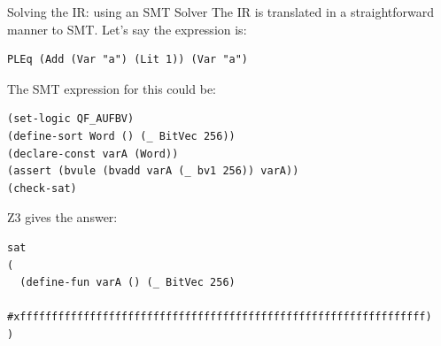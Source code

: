 \documentclass[aspectratio=169]{beamer}
\begin{document}
%
%
%

\begin{frame}[fragile=singleslide]{Solving the IR: using an SMT Solver}
The IR is translated in a straightforward manner to SMT. Let's say the expression is:

\begin{Verbatim}[frame=single, framerule=0.2mm, framesep=2mm,fontsize=\footnotesize]
PLEq (Add (Var "a") (Lit 1)) (Var "a")
\end{Verbatim}

The SMT expression for this could be:

\begin{Verbatim}[frame=single, framerule=0.2mm, framesep=2mm,fontsize=\footnotesize]
(set-logic QF_AUFBV)
(define-sort Word () (_ BitVec 256))
(declare-const varA (Word))
(assert (bvule (bvadd varA (_ bv1 256)) varA))
(check-sat)
\end{Verbatim}

Z3 gives the answer:

\begin{Verbatim}[frame=single, framerule=0.2mm, framesep=2mm,fontsize=\footnotesize]
sat
(
  (define-fun varA () (_ BitVec 256)
    #xffffffffffffffffffffffffffffffffffffffffffffffffffffffffffffffff)
)
\end{Verbatim}
\end{frame}
\end{document}
